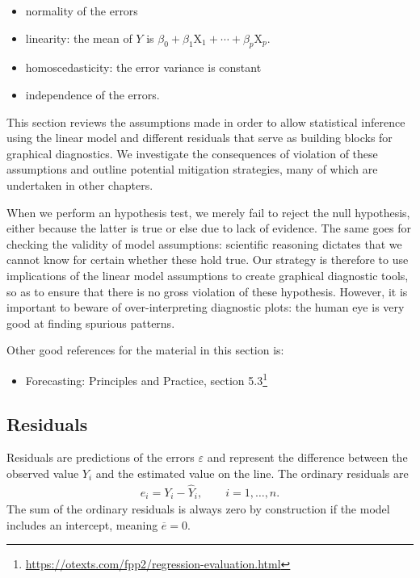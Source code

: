\documentclass[
  11pt,
  letterpaper,
]{book}
\providecommand{\tightlist}{%
  \setlength{\itemsep}{0pt}\setlength{\parskip}{0pt}}
\renewcommand{\href}[2]{#2\footnote{\url{#1}}}
\theoremstyle{definition}
\theoremstyle{definition}
\theoremstyle{definition}
\theoremstyle{remark}
\begin{document}
\begin{itemize}
\tightlist
\item
  normality of the errors
\item
  linearity: the mean of \(Y\) is \(\beta_0 + \beta_1\mathrm{X}_1 + \cdots + \beta_p \mathrm{X}_p\).
\item
  homoscedasticity: the error variance is constant
\item
  independence of the errors.
\end{itemize}

This section reviews the assumptions made in order to allow statistical inference using the linear model and different residuals that serve as building blocks for graphical diagnostics. We investigate the consequences of violation of these assumptions and outline potential mitigation strategies, many of which are undertaken in other chapters.

When we perform an hypothesis test, we merely fail to reject the null hypothesis, either because the latter is true or else due to lack of evidence. The same goes for checking the validity of model assumptions: scientific reasoning dictates that we cannot know for certain whether these hold true. Our strategy is therefore to use implications of the linear model assumptions to create graphical diagnostic tools, so as to ensure that there is no gross violation of these hypothesis. However, it is important to beware of over-interpreting diagnostic plots: the human eye is very good at finding spurious patterns.

Other good references for the material in this section is:

\begin{itemize}
\tightlist
\item
  \href{https://otexts.com/fpp2/regression-evaluation.html}{Forecasting: Principles and Practice, section 5.3}
\end{itemize}

\hypertarget{residuals}{%
\subsection{Residuals}\label{residuals}}

Residuals are predictions of the errors \(\varepsilon\) and represent the difference between the observed value \(Y_i\) and the estimated value on the line.
The ordinary residuals are
\begin{align*}
e_i=Y_i-\widehat{Y}_i, \qquad i =1, \ldots, n.
\end{align*}
The sum of the ordinary residuals is always zero by construction if the model includes an intercept, meaning \(\overline{e} = 0\).
\end{document}
